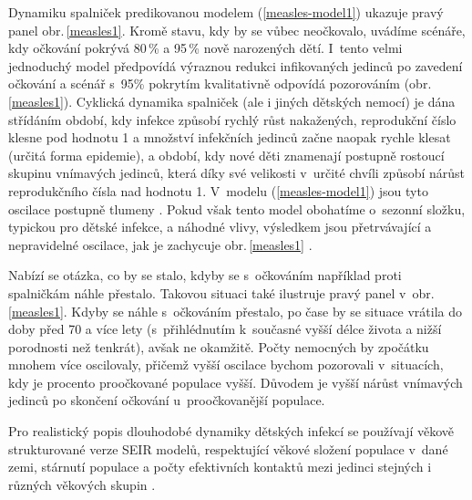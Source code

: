 Dynamiku spalniček predikovanou modelem (\ref{measles-model1}) ukazuje pravý panel obr.\,\ref{measles1}. Kromě stavu, kdy by se vůbec neočkovalo, uvádíme scénáře, kdy očkování pokrývá 80\,\% a 95\,\% nově narozených dětí. I~tento velmi jednoduchý model předpovídá výraznou redukci infikovaných jedinců po zavedení očkování a scénář s~95\% pokrytím kvalitativně odpovídá pozorováním (obr.\,\ref{measles1}). Cyklická dynamika spalniček (ale i jiných dětských nemocí) je dána střídáním období, kdy infekce způsobí rychlý růst nakažených, reprodukční číslo klesne pod hodnotu 1 a množství infekčních jedinců začne naopak rychle klesat (určitá forma epidemie), a období, kdy nové děti znamenají postupně rostoucí skupinu vnímavých jedinců, která díky své velikosti v~určité chvíli způsobí nárůst reprodukčního čísla nad hodnotu 1. V~modelu (\ref{measles-model1}) jsou tyto oscilace postupně tlumeny \cite{KeelingRohani2008}. Pokud však tento model obohatíme o~sezonní složku, typickou pro dětské infekce, a náhodné vlivy, výsledkem jsou přetrvávající a nepravidelné oscilace, jak je zachycuje obr.\,\ref{measles1} \cite{KeelingRohani2008}. 

Nabízí se otázka, co by se stalo, kdyby se s~očkováním například proti spalničkám náhle přestalo. Takovou situaci také ilustruje pravý panel v~obr.\,\ref{measles1}. Kdyby se náhle s~očkováním přestalo, po čase by se situace vrátila do doby před 70 a více lety (s~přihlédnutím k~současné vyšší délce života a nižší porodnosti než tenkrát), avšak ne okamžitě. Počty nemocných by zpočátku mnohem více oscilovaly, přičemž vyšší oscilace bychom pozorovali v~situacích, kdy je procento proočkované populace vyšší. Důvodem je vyšší nárůst vnímavých jedinců po skončení očkování u~proočkovanější populace. 


Pro realistický popis dlouhodobé dynamiky dětských infekcí se používají věkově strukturované verze SEIR modelů, respektující věkové složení populace v~dané zemi, stárnutí populace a počty efektivních kontaktů mezi jedinci stejných i různých věkových skupin \cite{KeelingRohani2008,VynnyckyWhite2010}.

